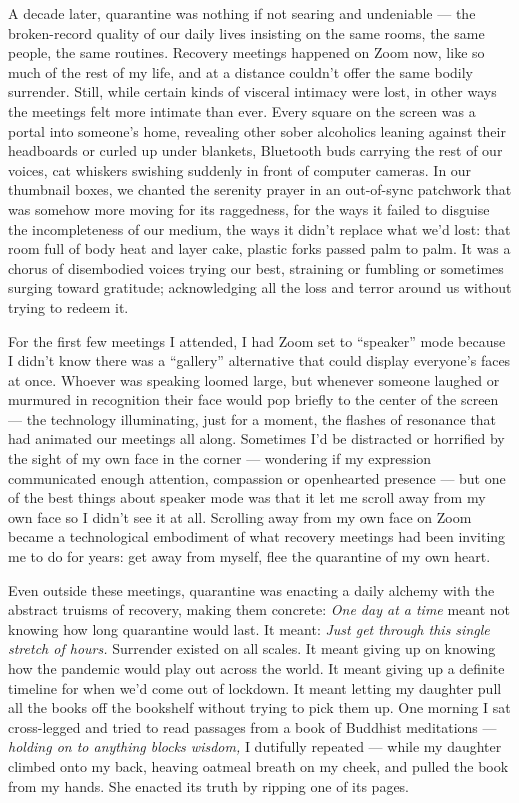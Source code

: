 A decade later, quarantine was nothing if not searing and undeniable ---
the broken-record quality of our daily lives insisting on the same
rooms, the same people, the same routines. Recovery meetings happened on
Zoom now, like so much of the rest of my life, and at a distance
couldn't offer the same bodily surrender. Still, while certain kinds of
visceral intimacy were lost, in other ways the meetings felt more
intimate than ever. Every square on the screen was a portal into
someone's home, revealing other sober alcoholics leaning against their
headboards or curled up under blankets, Bluetooth buds carrying the rest
of our voices, cat whiskers swishing suddenly in front of computer
cameras. In our thumbnail boxes, we chanted the serenity prayer in an
out-of-sync patchwork that was somehow more moving for its raggedness,
for the ways it failed to disguise the incompleteness of our medium, the
ways it didn't replace what we'd lost: that room full of body heat and
layer cake, plastic forks passed palm to palm. It was a chorus of
disembodied voices trying our best, straining or fumbling or sometimes
surging toward gratitude; acknowledging all the loss and terror around
us without trying to redeem it.

For the first few meetings I attended, I had Zoom set to ``speaker''
mode because I didn't know there was a ``gallery'' alternative that
could display everyone's faces at once. Whoever was speaking loomed
large, but whenever someone laughed or murmured in recognition their
face would pop briefly to the center of the screen --- the technology
illuminating, just for a moment, the flashes of resonance that had
animated our meetings all along. Sometimes I'd be distracted or
horrified by the sight of my own face in the corner --- wondering if my
expression communicated enough attention, compassion or openhearted
presence --- but one of the best things about speaker mode was that it
let me scroll away from my own face so I didn't see it at all. Scrolling
away from my own face on Zoom became a technological embodiment of what
recovery meetings had been inviting me to do for years: get away from
myself, flee the quarantine of my own heart.

Even outside these meetings, quarantine was enacting a daily alchemy
with the abstract truisms of recovery, making them concrete: \emph{One
day at a time} meant not knowing how long quarantine would last. It
meant: \emph{Just get through this single stretch of hours.} Surrender
existed on all scales. It meant giving up on knowing how the pandemic
would play out across the world. It meant giving up a definite timeline
for when we'd come out of lockdown. It meant letting my daughter pull
all the books off the bookshelf without trying to pick them up. One
morning I sat cross-legged and tried to read passages from a book of
Buddhist meditations --- \emph{holding on to anything blocks wisdom,} I
dutifully repeated --- while my daughter climbed onto my back, heaving
oatmeal breath on my cheek, and pulled the book from my hands. She
enacted its truth by ripping one of its pages.

